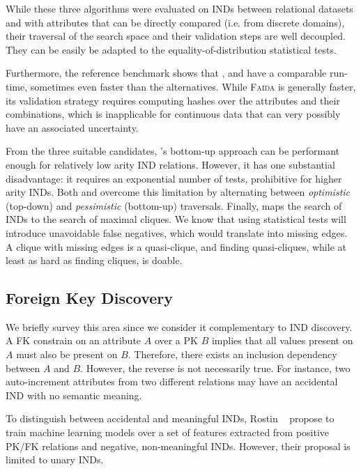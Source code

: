 While these three algorithms were evaluated on \glspl{IND} between relational datasets
and with attributes that can be directly compared (i.e. from discrete domains), their
traversal of the search space and their validation steps are well decoupled. They
can be easily be adapted to the equality-of-distribution statistical tests.

Furthermore, the reference benchmark shows that \Mind, \Find
and \Zigzag have a comparable run-time, sometimes even
faster than the alternatives.
While \textsc{Faida} is generally faster, its
validation strategy requires computing hashes over the
attributes and their combinations, which is inapplicable
for continuous data that can very possibly have an associated uncertainty.

From the three suitable candidates, \Mind's bottom-up approach can be performant enough for
relatively low arity \gls{IND} relations. However, it has one substantial disadvantage:
it requires an exponential number of tests, prohibitive for higher arity \glspl{IND}.
Both \Zigzag and \Find overcome this limitation by alternating between \emph{optimistic}
(top-down) and \emph{pessimistic} (bottom-up) traversals.
Finally, \Find maps the search of \glspl{IND} to the search of maximal cliques. We know that
using statistical tests will introduce unavoidable false negatives, which would
translate into missing edges.
A clique with missing edges is a quasi-clique, and finding quasi-cliques, while at least
as hard as finding cliques, is doable.

\subsection{Foreign Key Discovery}

We briefly survey this area since we consider it complementary to
\gls{IND} discovery. A \gls{FK} constrain on an attribute
$A$ over a \gls{PK} $B$ implies that all values present on $A$ must also be
present on $B$.
Therefore, there exists an inclusion dependency between $A$ and $B$.
However, the reverse is not necessarily true. For instance, two auto-increment attributes from
two different relations may have an accidental \gls{IND} with no semantic meaning.

To distinguish between accidental and meaningful \glspl{IND}, Rostin \etal~\cite{Rostin2009} propose to
train machine learning models over a set of features extracted from positive
\gls{PK}/\gls{FK} relations and negative, non-meaningful \glspl{IND}. However, their proposal
is limited to unary \glspl{IND}.

